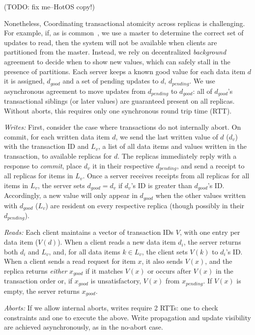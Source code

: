 (TODO: fix me--HotOS copy!)

Nonetheless, Coordinating transactional atomicity across replicas is
challenging. For example, if, as is common~\cite{readonly, eiger}, we
use a master to determine the correct set of updates to read, then the
system will not be available when clients are partitioned from the
master. Instead, we rely on decentralized \textit{background}
agreement to decide when to show new values, which can safely stall in
the presence of partitions. Each server keeps a known good value for
each data item $d$ it is assigned, $d_{good}$ and a set of pending
updates to $d$, $d_{pending}$. We use asynchronous agreement to move
updates from $d_{pending}$ to $d_{good}$: all of $d_{good}$'s
transactional siblings (or later values) are guaranteed present on all
replicas. Without aborts, this requires only one synchronous round
trip time (RTT).

\noindent\textit{Writes:} First, consider the case where transactions
do not internally abort. On commit, for each written data item $d$, we
send the last written value of $d$ ($d_v$) with the transaction ID and
$L_v$, a list of all data items and values written in the transaction,
to available replicas for $d$. The replicas immediately reply with a
response to \textit{commit}, place $d_v$ it in their respective
$d_{pending}$, and send a receipt to all replicas for items in
$L_v$. Once a server receives receipts from all replicas for all items
in $L_v$, the server sets $d_{good} = d_v$ if $d_v$'s ID is greater
than $d_{good}$'s ID. Accordingly, a new value will only appear in
$d_{good}$ when the other values written with $d_{good}$ ($L_v$) are
resident on every respective replica (though possibly in their
$d_{pending}$).\vspace{.5em}

\noindent\textit{Reads:} Each client maintains a vector of transaction
IDs $V$, with one entry per data item ($V(d)$). When a client reads a
new data item $d_i$, the server returns both $d_i$ and $L_v$, and, for
all data items $k \in L_v$, the client sets $V(k)$ to $d_i$'s ID. When
a client sends a read request for item $x$, it also sends $V(x)$, and
the replica returns \textit{either} $x_{good}$ if it matches $V(x)$ or
occurs after $V(x)$ in the transaction order or, if $x_{good}$ is
unsatisfactory, $V(x)$ from $x_{pending}$. If $V(x)$ is empty, the
server returns $x_{good}$.\vspace{.5em}

\noindent\textit{Aborts:} If we allow internal aborts, writes require
2 RTTs: one to check constraints and one to execute the above. Write
propagation and update visibility are achieved asynchronously, as in
the no-abort case.\vspace{.5em}

